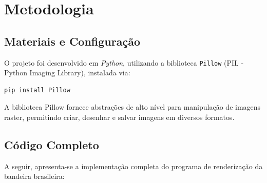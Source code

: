 \documentclass{article}
\begin{document}
\section{Metodologia}

\subsection{Materiais e Configuração}

O projeto foi desenvolvido em \textit{Python}, utilizando a biblioteca \texttt{Pillow} (PIL - Python Imaging Library), instalada via:

\begin{lstlisting}[style=pythonstyle]
pip install Pillow
\end{lstlisting}

A biblioteca Pillow fornece abstrações de alto nível para manipulação de imagens raster, permitindo criar, desenhar e salvar imagens em diversos formatos.

\subsection{Código Completo}

A seguir, apresenta-se a implementação completa do programa de renderização da bandeira brasileira:
\end{document}
